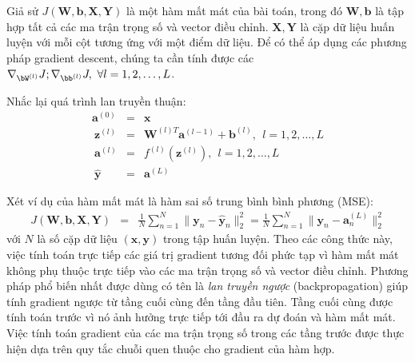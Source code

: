  
 
Giả sử $J(\mathbf{W, b, X, Y})$ là một hàm mất mát của bài toán, trong đó
$\mathbf{W, b}$ là tập hợp tất cả các ma trận trọng số và vector điều chỉnh. $\mathbf{X, Y}$ là cặp dữ liệu huấn luyện với mỗi cột
tương ứng với một điểm dữ liệu. Để có thể áp dụng các phương pháp gradient descent,
chúng ta cần tính được các 
\begin{math}
    \nabla_{\bW^{(l)}}J; \nabla_{\bb^{(l)}}J, ~\forall l = 1, 2, \dots, L
\end{math}.

Nhắc lại quá trình lan truyền thuận: 
\begin{eqnarray} 
\mathbf{a}^{(0)} &=& \mathbf{x} \\\
\mathbf{z}^{(l)}  &=& \mathbf{W}^{(l)T}\mathbf{a}^{(l-1)} + \mathbf{b}^{(l)},~~ l =  1, 2, \dots, L \\\ 
\mathbf{a}^{(l)} &=& f^{(l)}(\mathbf{z}^{(l)}), ~~ l =  1, 2, \dots, L \\\ 
\mathbf{\hat{y}} &=& \mathbf{a}^{(L)} 
\end{eqnarray} 


Xét ví dụ của hàm mất mát là hàm sai số trung bình bình phương (MSE):
\begin{eqnarray} 
J(\mathbf{W, b, X, Y}) &=& \frac{1}{N}\sum_{n=1}^N \| \mathbf{y}_n - \mathbf{\hat{y}}_n\|_2^2 
=\frac{1}{N}\sum_{n=1}^N \| \mathbf{y}_n - \mathbf{a}_n^{(L)}\|_2^2 
\end{eqnarray} 
với $N$ là số cặp dữ liệu $(\mathbf{x}, \mathbf{y})$ trong tập huấn luyện. Theo
các công thức này, việc tính toán trực tiếp các giá trị gradient tương đối phức
tạp vì hàm mất mát không phụ thuộc trực tiếp vào các ma trận trọng số và vector
điều chỉnh. Phương pháp phổ biến nhất được dùng có tên là \textit{lan truyền ngược}
(backpropagation) giúp tính gradient ngược từ tầng cuối cùng đến tầng đầu tiên.
Tầng cuối cùng được tính toán trước vì nó ảnh hưởng trực tiếp tới {đầu ra dự
đoán} và hàm mất mát. Việc tính toán gradient của các ma trận trọng số trong các
tầng trước được thực hiện dựa trên quy tắc chuỗi quen thuộc cho {gradient của hàm
hợp}.
 
